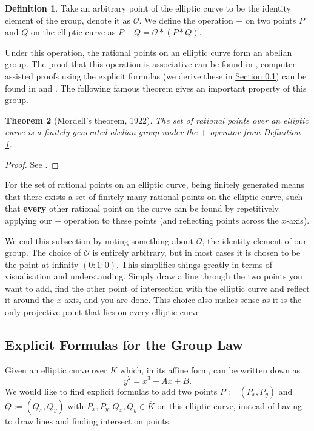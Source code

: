 \documentclass[openany, a4paper, 10pt]{book}
\theoremstyle{plain}
\newtheorem{theorem}{Theorem}[chapter]
\theoremstyle{plain}
\theoremstyle{plain}
\theoremstyle{definition}
\newtheorem{definition}[theorem]{Definition}
\theoremstyle{plain}
\theoremstyle{definition}
\theoremstyle{remark}
\newcommand{\defref}[1]{\hyperref[#1]{Definition \ref{#1}}}
\newcommand{\secref}[1]{\hyperref[#1]{Section \ref{#1}}}
\begin{document}
\begin{definition}\label{plus}
    Take an arbitrary point of the elliptic curve to be the identity element of the group,
    denote it as $\mathcal O$.
    We define the operation $+$ on two points $P$ and $Q$ on the elliptic curve as
    $P + Q = \mathcal O * (P * Q)$.
\end{definition}

Under this operation, the rational points on an elliptic curve form an abelian group.
The proof that this operation is associative can be found in \cite[Section~2.4]{washington}, computer-assisted proofs using the explicit formulas (we derive these in \secref{subsec:addition}) can be found in \cite{associativity_EC} and \cite{associativity_EC_2}.
The following famous theorem gives an important property of this group.

\begin{theorem}[Mordell's theorem, 1922]
    The set of rational points over an elliptic curve is a finitely generated abelian group under the $+$ operator from \defref{plus}.
\end{theorem}
\begin{proof}
    See \cite{mordell}.
\end{proof}
For the set of rational points on an elliptic curve, being finitely generated means that there exists a set of finitely many rational points on the elliptic curve,
such that \textbf{every} other rational point on the curve can be found by repetitively applying our $+$ operation to these points (and reflecting points across the $x$-axis).

We end this subsection by noting something about $\mathcal O$, the identity element of our group.
The choice of $\mathcal O$ is entirely arbitrary, but
in most cases it is chosen to be the point at infinity $(0:1:0)$.
This simplifies things greatly in terms of visualisation and understanding.
Simply draw a line through the two points you want to add,
find the other point of intersection with the elliptic curve and reflect it around
the $x$-axis, and you are done.
This choice also makes sense as it is the only projective point that lies on every elliptic curve.


\subsection{Explicit Formulas for the Group Law}\label{subsec:addition}
Given an elliptic curve over $K$ which, in its affine form, can be written down as
\begin{equation}\label{eq:EC_C}
    y^2 = x^3 + Ax + B.
\end{equation}
We would like to find explicit formulas to add two points $P:=(P_x, P_y)$ and $Q:=(Q_x, Q_y)$ with $P_x,P_y,Q_x,Q_y \in \overline K$ on this elliptic curve,
instead of having to draw lines and finding intersection points.
\end{document}
